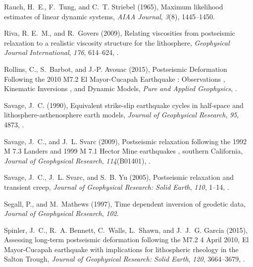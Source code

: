 \documentclass[draft,linenumbers]{AGUJournal}
\begin{document}
\begin{thebibliography}{52}
Rauch, H.~E., F.~Tung, and C.~T. Striebel (1965), {Maximum likelihood estimates
  of linear dynamic systems}, \textit{AIAA Journal}, \textit{3}(8), 1445--1450.

Riva, R. E.~M., and R.~Govers (2009), {Relating viscosities from postseismic
  relaxation to a realistic viscosity structure for the lithosphere},
  \textit{Geophysical Journal International}, \textit{176}, 614--624,
  .

Rollins, C., S.~Barbot, and J.-P. Avouac (2015), {Postseismic Deformation
  Following the 2010 M7.2 El Mayor-Cucapah Earthquake : Observations ,
  Kinematic Inversions , and Dynamic Models}, \textit{Pure and Applied
  Geophysics}, .

Savage, J.~C. (1990), {Equivalent strike-slip earthquake cycles in half-space
  and lithosphere-asthenosphere earth models}, \textit{Journal of Geophysical
  Research}, \textit{95}, 4873, .

Savage, J.~C., and J.~L. Svarc (2009), {Postseismic relaxation following the
  1992 M 7.3 Landers and 1999 M 7.1 Hector Mine earthquakes , southern
  California}, \textit{Journal of Geophysical Research}, \textit{114}(B01401),
  .

Savage, J.~C., J.~L. Svarc, and S.~B. Yu (2005), {Postseismic relaxation and
  transient creep}, \textit{Journal of Geophysical Research: Solid Earth},
  \textit{110}, 1--14, .

Segall, P., and M.~Mathews (1997), {Time dependent inversion of geodetic data},
  \textit{Journal of Geophysical Research}, \textit{102}.

Spinler, J.~C., R.~A. Bennett, C.~Walls, L.~Shawn, and J.~J.~G. Garcia (2015),
  {Assessing long-term postseismic deformation following the M7.2 4 April 2010,
  El Mayor-Cucapah earthquake with implications for lithospheric rheology in
  the Salton Trough}, \textit{Journal of Geophysical Research: Solid Earth},
  \textit{120}, 3664--3679, .


\end{thebibliography}
\end{document}
